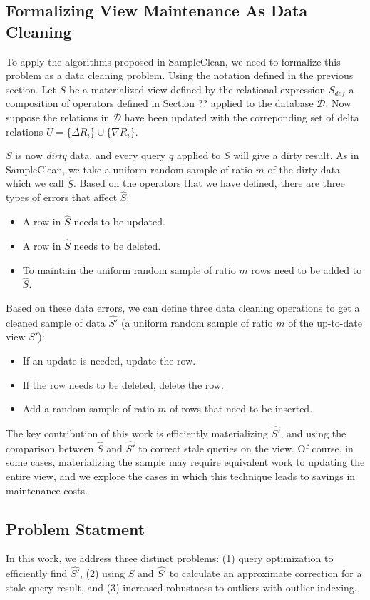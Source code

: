 \subsection{Formalizing View Maintenance As Data Cleaning}
To apply the algorithms proposed in SampleClean, we need to formalize this problem as a data cleaning problem.
Using the notation defined in the previous section. 
Let $S$ be a materialized view defined by the relational expression $S_{def}$ a composition of operators defined in Section ?? applied to the database $\mathcal{D}$.
Now suppose the relations in $\mathcal{D}$ have been updated with the correponding set of delta relations $U = \{\Delta R_i\} \cup \{\nabla R_i\}$.

$S$ is now \emph{dirty} data, and every query $q$ applied to $S$ will give a dirty result.
As in SampleClean, we take a uniform random sample of ratio $m$ of the dirty data which we call $\hat{S}$.
Based on the operators that we have defined, there are three types of errors that affect $\hat{S}$:
\begin{itemize}
\item A row in $\hat{S}$ needs to be updated.
\item A row in $\hat{S}$ needs to be deleted.
\item To maintain the uniform random sample of ratio $m$ rows need to be added to $\hat{S}$.
\end{itemize}

Based on these data errors, we can define three data cleaning operations to get a cleaned sample of data $\hat{S'}$ (a uniform random sample of ratio $m$ of the up-to-date view $S'$):
\begin{itemize}
\item If an update is needed, update the row.
\item If the row needs to be deleted, delete the row.
\item Add a random sample of ratio $m$ of rows that need to be inserted.
\end{itemize}

The key contribution of this work is efficiently materializing $\hat{S'}$, and using the comparison between $\hat{S}$ and $\hat{S'}$ to correct stale queries on the view.
Of course, in some cases, materializing the sample may require equivalent work to updating the entire view, and we explore the cases in which this technique leads to savings in maintenance costs.

\subsection{Problem Statment}
In this work, we address three distinct problems: (1) query optimization to efficiently find $\hat{S'}$, (2) using $\hat{S}$ and $\hat{S'}$ to calculate an approximate correction for a stale query result, and (3) increased robustness to outliers with outlier indexing.

